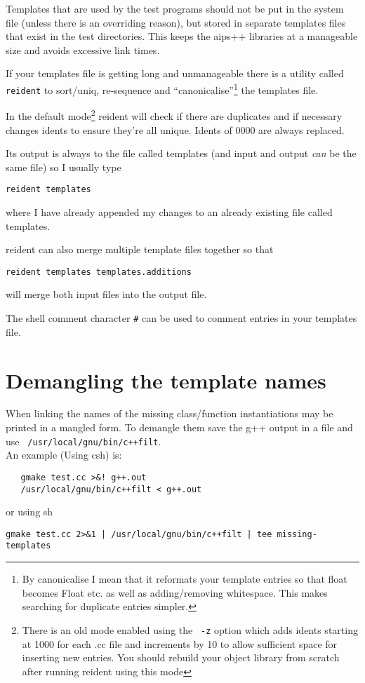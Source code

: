 Templates that are used by the test programs should not be put in the
system file (unless there is an overriding reason), but stored in
separate templates files that exist in the test directories. This keeps
the aips++ libraries at a manageable size and avoids excessive link
times. 

If your templates file is getting long and unmanageable there is a utility
called \texttt{ reident} to sort/uniq, re-sequence and
``canonicalise''\footnote{By canonicalise I mean that it reformats your
  template entries so that float becomes Float etc. as well as
  adding/removing whitespace. This makes searching for duplicate entries
  simpler.} the templates file.

In the default mode\footnote{There is an old mode enabled using the \texttt{
    -z} option which adds idents starting at 1000 for each .cc file and
  increments by 10 to allow sufficient space for inserting new entries. You
  should rebuild your object library from scratch after running reident
  using this mode} reident will check if there are duplicates and if
necessary changes idents to ensure they're all unique.  Idents of $0000$ are
always replaced.

Its output is always to the file called templates (and input and output
\emph{can} be the same file) so I usually type
\begin{verbatim}
reident templates
\end{verbatim}
where I have already appended my changes to an already existing file called
templates. 

reident can also merge multiple template files together so that
\begin{verbatim}
reident templates templates.additions
\end{verbatim}
will merge both input files into the output file. 

The shell comment character \texttt{\#} can be used to comment entries in
your templates file.

\section{Demangling the template names}
When linking the names of the missing class/function instantiations may
be printed in a mangled form. 
To demangle them save the g++ output in a
file and use \texttt{ /usr/local/gnu/bin/c++filt}. \\
An example (Using csh) is:
\begin{verbatim}
   gmake test.cc >&! g++.out
   /usr/local/gnu/bin/c++filt < g++.out
\end{verbatim}
or using sh 
\begin{verbatim}
gmake test.cc 2>&1 | /usr/local/gnu/bin/c++filt | tee missing-templates
\end{verbatim}

